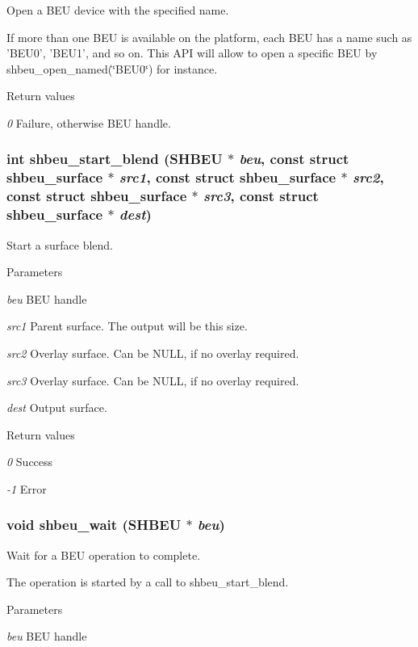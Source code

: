 Open a BEU device with the specified name. 

If more than one BEU is available on the platform, each BEU has a name such as 'BEU0', 'BEU1', and so on. This API will allow to open a specific BEU by shbeu\_\-open\_\-named(\char`\"{}BEU0\char`\"{}) for instance. 
\begin{DoxyRetVals}{Return values}
\item[{\em 0}]Failure, otherwise BEU handle. \end{DoxyRetVals}
\subsubsection[{shbeu\_\-start\_\-blend}]{\setlength{\rightskip}{0pt plus 5cm}int shbeu\_\-start\_\-blend (SHBEU $\ast$ {\em beu}, \/  const struct {\bf shbeu\_\-surface} $\ast$ {\em src1}, \/  const struct {\bf shbeu\_\-surface} $\ast$ {\em src2}, \/  const struct {\bf shbeu\_\-surface} $\ast$ {\em src3}, \/  const struct {\bf shbeu\_\-surface} $\ast$ {\em dest})}\label{shbeu_8h_af9b538f535412e83ade2b30aabe4fe3d}


Start a surface blend. 


\begin{DoxyParams}{Parameters}
\item[{\em beu}]BEU handle \item[{\em src1}]Parent surface. The output will be this size. \item[{\em src2}]Overlay surface. Can be NULL, if no overlay required. \item[{\em src3}]Overlay surface. Can be NULL, if no overlay required. \item[{\em dest}]Output surface. \end{DoxyParams}

\begin{DoxyRetVals}{Return values}
\item[{\em 0}]Success \item[{\em -\/1}]Error \end{DoxyRetVals}
\subsubsection[{shbeu\_\-wait}]{\setlength{\rightskip}{0pt plus 5cm}void shbeu\_\-wait (SHBEU $\ast$ {\em beu})}\label{shbeu_8h_aab59389e146d18776f96701a2b3e470d}


Wait for a BEU operation to complete. 

The operation is started by a call to shbeu\_\-start\_\-blend. 
\begin{DoxyParams}{Parameters}
\item[{\em beu}]BEU handle \end{DoxyParams}
